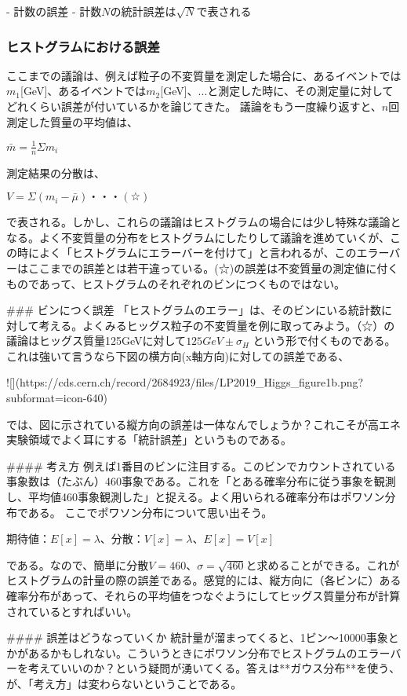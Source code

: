 \documentclass[uplatex]{jsarticle}
\begin{document}
- 計数の誤差
- 計数$N$の統計誤差は$\sqrt{N}$で表される


\subsubsection{ヒストグラムにおける誤差}
ここまでの議論は、例えば粒子の不変質量を測定した場合に、あるイベントでは$m_1$[GeV]、あるイベントでは$m_2$[GeV]、...と測定した時に、その測定量に対してどれくらい誤差が付いているかを論じてきた。
議論をもう一度繰り返すと、$n$回測定した質量の平均値は、

$\bar{m}=\frac{1}{n}\Sigma m_i$

測定結果の分散は、

$V=\Sigma(m_i-\bar{\mu})・・・(☆)$

で表される。しかし、これらの議論はヒストグラムの場合には少し特殊な議論となる。よく不変質量の分布をヒストグラムにしたりして議論を進めていくが、この時によく「ヒストグラムにエラーバーを付けて」と言われるが、このエラーバーはここまでの誤差とは若干違っている。(☆)の誤差は不変質量の測定値に付くものであって、ヒストグラムのそれぞれのビンにつくものではない。

### ビンにつく誤差
「ヒストグラムのエラー」は、そのビンにいる統計数に対して考える。よくみるヒッグス粒子の不変質量を例に取ってみよう。（☆）の議論はヒッグス質量125GeVに対して$125GeV \pm \sigma_{H}$ という形で付くものである。これは強いて言うなら下図の横方向(x軸方向)に対しての誤差である、

![](https://cds.cern.ch/record/2684923/files/LP2019_Higgs_figure1b.png?subformat=icon-640)

では、図に示されている縦方向の誤差は一体なんでしょうか？これこそが高エネ実験領域でよく耳にする「統計誤差」というものである。

#### 考え方
例えば1番目のビンに注目する。このビンでカウントされている事象数は（たぶん）460事象である。これを「とある確率分布に従う事象を観測し、平均値460事象観測した」と捉える。よく用いられる確率分布はポワソン分布である。
ここでポワソン分布について思い出そう。

期待値：$E[x]=\lambda$、分散：$V[x]=\lambda$、$E[x]=V[x]$

である。なので、簡単に分散$V=460$、$\sigma=\sqrt{460}$と求めることができる。これがヒストグラムの計量の際の誤差である。感覚的には、縦方向に（各ビンに）ある確率分布があって、それらの平均値をつなぐようにしてヒッグス質量分布が計算されているとすればいい。


#### 誤差はどうなっていくか
統計量が溜まってくると、1ビン〜10000事象とかがあるかもしれない。こういうときにポワソン分布でヒストグラムのエラーバーを考えていいのか？という疑問が湧いてくる。答えは**ガウス分布**を使う、が、「考え方」は変わらないということである。
\end{document}
